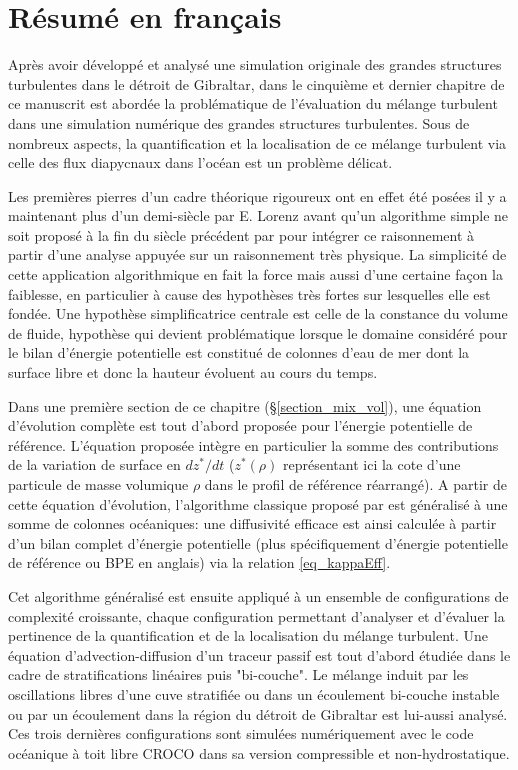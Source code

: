 \section{Résumé en français}
Après avoir développé et analysé une simulation originale des grandes structures turbulentes dans le détroit de Gibraltar, dans le cinquième et dernier chapitre de ce manuscrit est abordée la problématique de l'évaluation du mélange turbulent dans une simulation numérique des grandes structures turbulentes. Sous de nombreux aspects, la quantification et la localisation de ce mélange turbulent via celle des flux diapycnaux dans l'océan est un problème délicat.

Les premières pierres d'un cadre théorique rigoureux ont en effet été posées il y a maintenant plus d'un demi-siècle par E. Lorenz \citep{lorenz_available_1955} avant qu'un algorithme simple ne soit proposé à la fin du siècle précédent par \cite{winters_available_1995} pour intégrer ce raisonnement à partir d'une analyse appuyée sur un raisonnement très physique. La simplicité de cette application algorithmique en fait la force mais aussi d'une certaine façon la faiblesse, en particulier à cause des hypothèses très fortes sur lesquelles elle est fondée. Une hypothèse simplificatrice centrale est celle de la constance du volume de fluide, hypothèse qui devient problématique lorsque le domaine considéré pour le bilan d'énergie potentielle est constitué de colonnes d'eau de mer dont la surface libre et donc la hauteur évoluent au cours du temps.

Dans une première section de ce chapitre (\S \ref{section_mix_vol}), une équation d'évolution complète est tout d'abord proposée pour l'énergie potentielle de référence. L'équation proposée intègre en particulier la somme des contributions de la variation de surface en $dz^*/dt$ ($z^*(\rho)$ représentant ici la cote d'une particule de masse volumique $\rho$ dans le profil de référence réarrangé). A partir de cette équation d'évolution, l'algorithme classique proposé par \cite{winters_available_1995} est généralisé à une somme de colonnes océaniques: une diffusivité efficace est ainsi calculée à partir d'un bilan complet d'énergie potentielle (plus spécifiquement d'énergie potentielle de référence ou BPE en anglais) via la relation \ref{eq_kappaEff}.

Cet algorithme généralisé est ensuite appliqué à un ensemble de configurations de complexité croissante, chaque configuration permettant d'analyser et d'évaluer la pertinence de la quantification et de la localisation du mélange turbulent. Une équation d'advection-diffusion d'un traceur passif est tout d'abord étudiée dans le cadre de stratifications linéaires puis "bi-couche". Le mélange induit par les oscillations libres d'une cuve stratifiée ou dans un écoulement bi-couche instable ou par un écoulement dans la région du détroit de Gibraltar est lui-aussi analysé. Ces trois dernières configurations sont simulées numériquement avec le code océanique à toit libre CROCO dans sa version compressible et non-hydrostatique.


